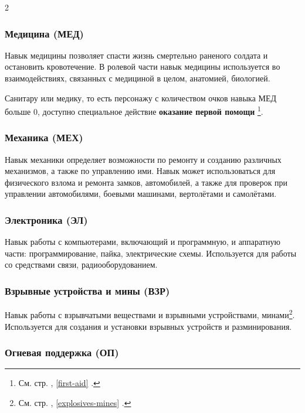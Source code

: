 \documentclass[twoside]{article}
\begin{document}
\begin{multicols}{2}
\subsubsection{Медицина (МЕД)}\label{medicine}

Навык медицины позволяет спасти жизнь смертельно раненого солдата и
остановить кровотечение. В ролевой части навык медицины используется во
взаимодействиях, связанных с медициной в целом, анатомией, биологией.

Санитару или медику, то есть персонажу с количеством очков навыка МЕД
больше 0, доступно специальное действие \textbf{оказание первой помощи}
\footnote{См. стр. \pageref{first-aid}, \ref{first-aid} .}.

\subsubsection{Механика (МЕХ)}\label{mechanics}

Навык механики определяет возможности по ремонту и созданию различных
механизмов, а также по управлению ими. Навык может использоваться для
физического взлома и ремонта замков, автомобилей, а также для проверок
при управлении автомобилями, боевыми машинами, вертолётами и самолётами.

\subsubsection{Электроника (ЭЛ)}\label{electronics}

Навык работы с компьютерами, включающий и программную, и аппаратную
части: программирование, пайка, электрические схемы. Используется для
работы со средствами связи, радиооборудованием.

\subsubsection{Взрывные устройства и мины (ВЗР)}\label{explosives}

Навык работы с взрывчатыми веществами и взрывными устройствами,
минами\footnote{См. стр. \pageref{explosives-mines}, \ref{explosives-mines} .}.
Используется для создания и установки взрывных устройств и
разминирования.

\subsubsection{Огневая поддержка (ОП)}\label{fire-support}


\end{multicols}
\end{document}
